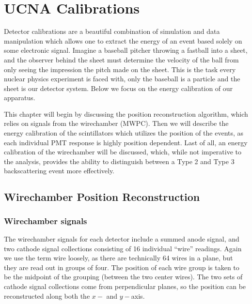 \chapter{UCNA Calibrations}
\label{ch:UCNA_Calibrations}

Detector calibrations are a beautiful combination
of simulation and data manipulation which allows one to extract the energy of
an event based solely on some electronic signal. Imagine a baseball pitcher
throwing a fastball into a sheet, and the observer behind the sheet must
determine the velocity of the ball from only seeing the impression the pitch
made on the sheet. This is the task every nuclear physics experiment is faced
with, only the baseball is a particle and the sheet is our detector system.
Below we focus on the energy calibration of our apparatus.

This chapter will begin by discussing the position reconstruction algorithm,
which relies on signals from the wirechamber (MWPC). Then we will describe
the energy calibration of the scintillators which utilizes the
position of the events, as each individual PMT response is highly position
dependent. Last of all, an energy calibration of the wirechamber will be
discussed, which, while not imperative to the analysis, provides the ability to
distinguish between a Type 2 and Type 3 backscattering event more
effectively.




\section{Wirechamber Position Reconstruction}

\subsection{Wirechamber signals}

The wirechamber signals for each detector include a summed anode signal, and two cathode signal
collections consisting of 16 individual ``wire'' readings. Again we use the term
wire loosely, as there are technically 64 wires in a plane, but they are read out in groups
of four. The position of each wire group is taken to be the midpoint of the grouping (between
the two center wires). The two sets of cathode signal collections come from perpendicular
planes, so the position can be reconstructed along both the $x-$ and $y-$axis.

